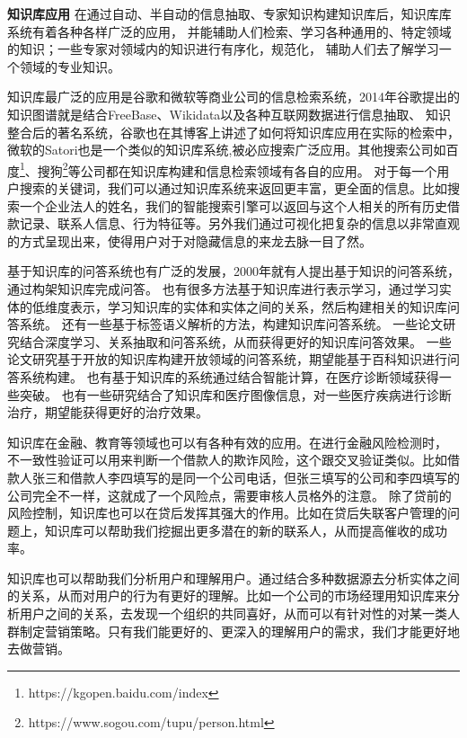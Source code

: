 \textbf{知识库应用}
在通过自动、半自动的信息抽取、专家知识构建知识库后，知识库库系统有着各种各样广泛的应用，
并能辅助人们检索、学习各种通用的、特定领域的知识；一些专家对领域内的知识进行有序化，规范化，
辅助人们去了解学习一个领域的专业知识。

知识库最广泛的应用是谷歌和微软等商业公司的信息检索系统，2014年谷歌提出的知识图谱\cite{Dong2014KnowledgeVA}就是结合FreeBase、Wikidata以及各种互联网数据进行信息抽取、
知识整合后的著名系统，谷歌也在其博客上讲述了如何将知识库应用在实际的检索中，
微软的Satori也是一个类似的知识库系统,被必应搜索广泛应用。其他搜索公司如百度\footnote{https://kgopen.baidu.com/index}、搜狗\footnote{https://www.sogou.com/tupu/person.html}等公司都在知识库构建和信息检索领域有各自的应用。
对于每一个用户搜索的关键词，我们可以通过知识库系统来返回更丰富，更全面的信息。比如搜索一个企业法人的姓名，我们的智能搜索引擎可以返回与这个人相关的所有历史借款记录、联系人信息、行为特征等。另外我们通过可视化把复杂的信息以非常直观的方式呈现出来，使得用户对于对隐藏信息的来龙去脉一目了然。

基于知识库的问答系统也有广泛的发展，2000年就有人提出基于知识的问答系统\cite{HERMJAKOB2000KnowledgeBasedQA}，通过构架知识库完成问答。
也有很多方法基于知识库进行表示学习\cite{Yang2014JointRE}，通过学习实体的低维度表示，学习知识库的实体和实体之间的关系，然后构建相关的知识库问答系统。
还有一些基于标签语义解析的方法，构建知识库问答系统\cite{Yih2016TheVO}。
一些论文\cite{Yu2017ImprovedNR}研究结合深度学习、关系抽取和问答系统，从而获得更好的知识库问答效果。
一些论文\cite{KeySun2016OpenKB}研究基于开放的知识库构建开放领域的问答系统，期望能基于百科知识进行问答系统构建。
也有基于知识库的系统通过结合智能计算\cite{Pandey2009KnowledgeAI}，在医疗诊断领域获得一些突破。
也有一些研究结合了知识库和医疗图像信息\cite{Halpern2014EvaluationOC}，对一些医疗疾病进行诊断治疗，期望能获得更好的治疗效果。

知识库在金融、教育等领域也可以有各种有效的应用。在进行金融风险检测时，
不一致性验证可以用来判断一个借款人的欺诈风险，这个跟交叉验证类似。比如借款人张三和借款人李四填写的是同一个公司电话，但张三填写的公司和李四填写的公司完全不一样，这就成了一个风险点，需要审核人员格外的注意。
除了贷前的风险控制，知识库也可以在贷后发挥其强大的作用。比如在贷后失联客户管理的问题上，知识库可以帮助我们挖掘出更多潜在的新的联系人，从而提高催收的成功率。

知识库也可以帮助我们分析用户和理解用户。通过结合多种数据源去分析实体之间的关系，从而对用户的行为有更好的理解。比如一个公司的市场经理用知识库来分析用户之间的关系，去发现一个组织的共同喜好，从而可以有针对性的对某一类人群制定营销策略。只有我们能更好的、更深入的理解用户的需求，我们才能更好地去做营销。

